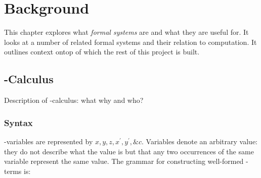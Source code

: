 \chapter{Background}

This chapter explores what \emph{formal systems} are and what they are useful for. It looks at a number of related formal systems and their relation to computation. It outlines context ontop of which the rest of this project is built.


%
%
%

\section{\lam-Calculus}

Description of \lam-calculus: what why and who?

\subsection{Syntax}
  
  \lam-variables are represented by $x,y,z,x^\prime,y^\prime,\&c$. Variables 
  denote an arbitrary value: they do not describe what the value is but that 
  any two occurrences of the same variable represent the same value. The 
  grammar for constructing well-formed \lam-terms is:

